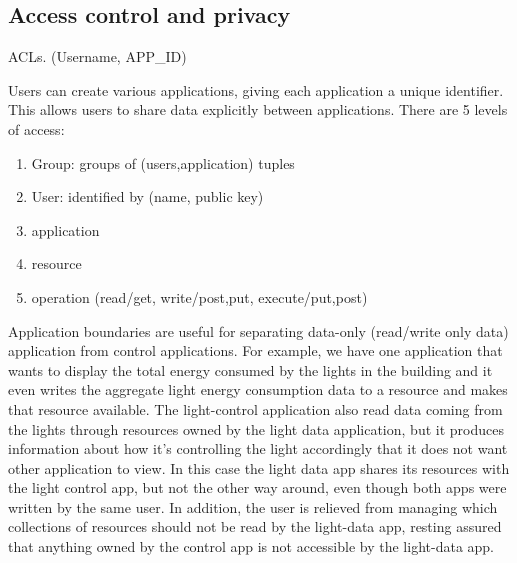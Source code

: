 \documentclass[10pt,print,letterpaper]{sigplan-proc-varsize}
\begin{document}
\subsection{Access control and privacy}
ACLs.  (Username, APP\_ID)

Users can create various applications, giving each application a unique identifier.  This allows users to share
data explicitly between applications.  There are 5 levels of access:
\begin{enumerate}
\item Group: groups of (users,application) tuples
\item User: identified by (name, public key)
\item application
\item resource
\item operation (read/get, write/post,put, execute/put,post)
\end{enumerate}

Application boundaries are useful for separating data-only (read/write only data) application from control applications.
For example, we have one application that wants to display the total energy consumed by the lights in the building and 
it even writes the aggregate light energy consumption data to a resource and makes that resource available.  The light-control
application also read data coming from the lights through resources owned by the light data application, but it produces
information about how it's controlling the light accordingly that it does not want other application to view. 
In this case the light data app shares its resources with the light control app, but not the other way around, even though
both apps were written by the same user.  In addition, the user is relieved from managing which collections of resources
should not be read by the light-data app, resting assured that anything owned by the control app is not accessible by
the light-data app.


\vspace{+0.5mm}
\vspace{+2mm}


\end{document}

